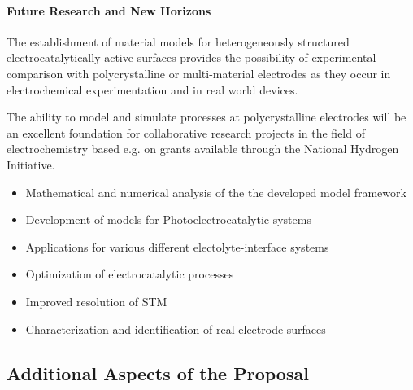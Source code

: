 \documentclass[a4paper,10pt]{article}
\begin{document}
\paragraph{Future Research and New Horizons}
The establishment of material models for heterogeneously structured electrocatalytically active surfaces
provides the possibility of experimental comparison with polycrystalline or  multi-material electrodes
as they occur in electrochemical experimentation and in real world devices.

The ability to model and simulate processes at polycrystalline electrodes will be an excellent foundation
for collaborative research projects in the field of electrochemistry based e.g. on grants available through
the National Hydrogen Initiative.

\begin{itemize}
\item Mathematical and numerical  analysis  of the the developed model framework
\item Development of models for Photoelectrocatalytic systems
\item Applications for various different electolyte-interface systems
\item Optimization of electrocatalytic processes
\item Improved resolution of STM
\item Characterization and identification of real electrode surfaces
\end{itemize}







\subsection*{Additional Aspects of the Proposal}
\end{document}
